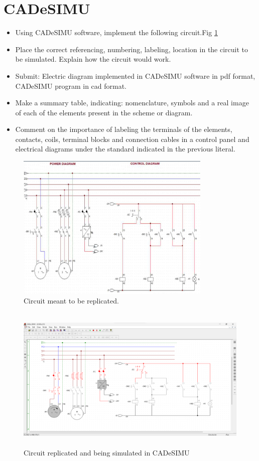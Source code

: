 \documentclass[runningheads]{llncs}
\begin{document}
\section{CADeSIMU}
\begin{itemize}
    \item Using CADeSIMU software, implement the following circuit.Fig \ref{fig:CircuitToReplicate}
    \item Place the correct referencing, numbering, labeling, location in the circuit to be simulated. Explain how the circuit would work.
    \item Submit: Electric diagram implemented in CADeSIMU software in pdf format, CADeSIMU program in cad format.
    \item Make a summary table, indicating: nomenclature, symbols and a real image of each of the elements present in the scheme or diagram.
    \item Comment on the importance of labeling the terminals of the elements, contacts, coils, terminal blocks and connection cables in a control panel and electrical diagrams under the standard indicated in the previous literal.
\end{itemize}
\begin{figure}[!ht]
    \centering
    \caption{Circuit meant to be replicated.}\label{fig:CircuitToReplicate}
    \includegraphics[width=\linewidth, height=7cm]{CircuitToReplicate.png}
\end{figure}

\newpage

\begin{figure}[h]
    \centering
    \caption{Circuit replicated and being simulated in CADeSIMU}\label{fig:}
    \includegraphics[width=\linewidth, height=7cm]{CircuitReplicated.png}
\end{figure}
\end{document}
